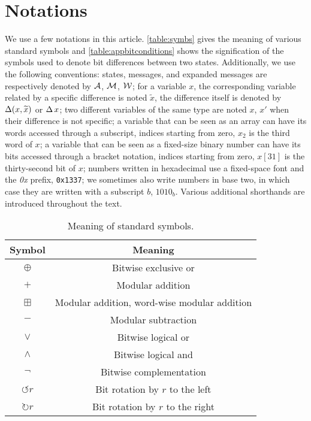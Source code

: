 \section{Notations}
\label{sec:not}

We use a few notations in this article. \autoref{table:symbs} gives the meaning of various standard symbols and \autoref{table:appbitconditions} shows the signification of the symbols used to denote bit differences between two states.
Additionally, we use the following conventions: \shaone states, messages, and expanded messages are respectively denoted by $\mathcal{A}$, $\mathcal{M}$, $\mathcal{W}$; for a variable $x$, the corresponding variable related by a specific
difference is noted $\widetilde{x}$, the difference itself is denoted by $\operatorname{\Delta}(x,\widetilde{x})$ or $\operatorname{\Delta} x$; two different variables of the same type are noted $x$, $x'$ when their difference is not specific;
a variable that can be seen as an array can have its words accessed through a subscript, indices starting from zero, \eg $x_2$ is the third word of $x$; a variable that can be seen as a fixed-size binary number
can have its bits accessed through a bracket notation, indices starting from zero, \eg $x[31]$ is the thirty-second bit of $x$; 
numbers written in hexadecimal use a fixed-space font and the \emph{0x} prefix, \eg \texttt{0x1337}; we sometimes also write numbers in base two, in which case they are written with a subscript $b$, \eg $1010_b$.
Various additional shorthands are introduced throughout the text.

\begin{table}[!htb]
\caption{Meaning of standard symbols.}\label{table:symbs}
\begin{center}
\begin{tabular}{c c}
\toprule
Symbol & Meaning\\
\midrule
$\oplus$ & Bitwise exclusive or\\
$+$ & Modular addition\\
$\boxplus$ & Modular addition, word-wise modular addition\\
$-$ & Modular subtraction\\
$\vee$ & Bitwise logical or\\
$\wedge$ & Bitwise logical and\\
$\neg$ & Bitwise complementation\\
$\circlearrowleft r$ & Bit rotation by $r$ to the left\\
$\circlearrowright r$ & Bit rotation by $r$ to the right\\
\bottomrule
\end{tabular}
\end{center}
\end{table}

